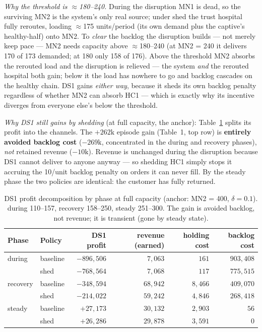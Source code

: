 \documentclass[11pt]{article}
\begin{document}
\emph{Why the threshold is $\approx$180--240.} During the disruption MN1 is dead, so the
surviving MN2 is the system's only real source; under shed the trust hospital fully reroutes,
loading $\approx$175 units/period (its own demand plus the captive's healthy-half) onto MN2. To
\emph{clear} the backlog the disruption builds --- not merely keep pace --- MN2 needs capacity
above $\approx$180--240 (at MN2 = 240 it delivers 170 of 173 demanded; at 180 only 158 of 176).
Above the threshold MN2 absorbs the rerouted load and the disruption is relieved --- the system
\emph{and} the rerouted hospital both gain; below it the load has nowhere to go and backlog
cascades on the healthy chain. DS1 gains \emph{either way}, because it sheds its own backlog
penalty regardless of whether MN2 can absorb HC1 --- which is exactly why its incentive diverges
from everyone else's below the threshold.

\emph{Why DS1 still gains by shedding} (at full capacity, the anchor): Table~\ref{tab:channel}
splits its profit into the channels. The $+262\mathrm{k}$ episode gain (Table~1, top row) is
\textbf{entirely avoided backlog cost} ($-269\mathrm{k}$, concentrated in the during and
recovery phases), \emph{not} retained revenue ($-10\mathrm{k}$). Revenue is unchanged during the
disruption because DS1 cannot deliver to anyone anyway --- so shedding HC1 simply stops it
accruing the 10/unit backlog penalty on orders it can never fill. By the steady phase the two
policies are identical: the customer has fully returned.

\begin{table}[h]
\centering\small
\caption{DS1 profit decomposition by phase at full capacity (anchor: MN2 = 400, $\delta=0.1$).
during 110--157, recovery 158--250, steady 251--300. The gain is avoided backlog, not revenue;
it is transient (gone by steady state).}
\label{tab:channel}
\begin{tabular}{l l r r r r}
\toprule
Phase & Policy & DS1 profit & revenue (earned) & holding cost & backlog cost \\
\midrule
during   & baseline & $-896{,}506$ & $7{,}063$  & $161$   & $903{,}408$ \\
         & shed     & $-768{,}564$ & $7{,}068$  & $117$   & $775{,}515$ \\
recovery & baseline & $-348{,}594$ & $68{,}942$ & $8{,}466$ & $409{,}070$ \\
         & shed     & $-214{,}022$ & $59{,}242$ & $4{,}846$ & $268{,}418$ \\
steady   & baseline & $+27{,}173$  & $30{,}132$ & $2{,}903$ & $56$ \\
         & shed     & $+26{,}286$  & $29{,}878$ & $3{,}591$ & $0$ \\
\bottomrule
\end{tabular}
\end{table}
\end{document}
